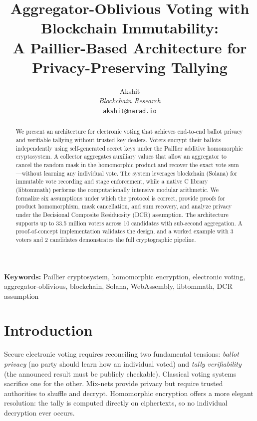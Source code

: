 \documentclass[11pt, a4paper]{article}
\title{\textbf{Aggregator-Oblivious Voting with Blockchain Immutability:\\ A Paillier-Based Architecture for Privacy-Preserving Tallying}}
\author{Akshit \\ \textit{Blockchain Research} \\ \texttt{akshit@narad.io}}
\date{}
\begin{document}
\maketitle

\begin{abstract}
We present an architecture for electronic voting that achieves end-to-end ballot privacy and verifiable tallying without trusted key dealers. Voters encrypt their ballots independently using self-generated secret keys under the Paillier additive homomorphic cryptosystem. A collector aggregates auxiliary values that allow an aggregator to cancel the random mask in the homomorphic product and recover the exact vote sum---without learning any individual vote. The system leverages blockchain (Solana) for immutable vote recording and stage enforcement, while a native C library (libtommath) performs the computationally intensive modular arithmetic. We formalize six assumptions under which the protocol is correct, provide proofs for product homomorphism, mask cancellation, and sum recovery, and analyze privacy under the Decisional Composite Residuosity (DCR) assumption. The architecture supports up to 33.5 million voters across 10 candidates with sub-second aggregation. A proof-of-concept implementation validates the design, and a worked example with 3 voters and 2 candidates demonstrates the full cryptographic pipeline.
\end{abstract}

\medskip
\noindent\textbf{Keywords:} Paillier cryptosystem, homomorphic encryption, electronic voting, aggregator-oblivious, blockchain, Solana, WebAssembly, libtommath, DCR assumption

\tableofcontents
\newpage

\section{Introduction}

Secure electronic voting requires reconciling two fundamental tensions: \emph{ballot privacy} (no party should learn how an individual voted) and \emph{tally verifiability} (the announced result must be publicly checkable). Classical voting systems sacrifice one for the other. Mix-nets provide privacy but require trusted authorities to shuffle and decrypt. Homomorphic encryption offers a more elegant resolution: the tally is computed directly on ciphertexts, so no individual decryption ever occurs.
\end{document}
